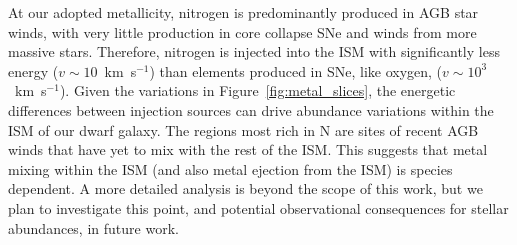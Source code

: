 \documentclass[twocolumn]{aastex61}
\begin{document}
At our adopted metallicity, nitrogen is predominantly produced in AGB star winds, with very little production in core collapse SNe and winds from more massive stars. Therefore, nitrogen is injected into the ISM with significantly less energy ($v \sim 10$~km~s$^{-1}$) than elements produced in SNe, like oxygen, ($v\sim 10^3$~km~s$^{-1}$). Given the variations in Figure~\ref{fig:metal_slices}, the energetic differences between injection sources can drive abundance variations within the ISM of our dwarf galaxy. The regions most rich in N are sites of recent AGB winds that have yet to mix with the rest of the ISM. This suggests that metal mixing within the ISM (and also metal ejection from the ISM) is species dependent. A more detailed analysis is beyond the scope of this work, but we plan to investigate this point, and potential observational consequences for stellar abundances, in future work. 


\end{document}
